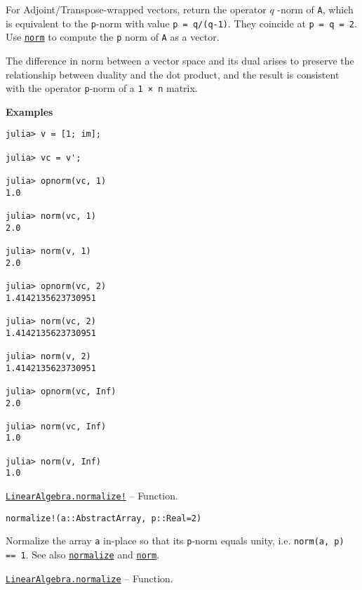 \begin{adjustwidth}{2em}{0pt}
For Adjoint/Transpose-wrapped vectors, return the operator  \(q\) -norm of \texttt{A}, which is equivalent to the \texttt{p}-norm with value \texttt{p = q/(q-1)}. They coincide at \texttt{p = q = 2}. Use \hyperlink{898926013064269707}{\texttt{norm}} to compute the \texttt{p} norm of \texttt{A} as a vector.

The difference in norm between a vector space and its dual arises to preserve the relationship between duality and the dot product, and the result is consistent with the operator \texttt{p}-norm of a \texttt{1 × n} matrix.

\textbf{Examples}


\begin{verbatim}
julia> v = [1; im];

julia> vc = v';

julia> opnorm(vc, 1)
1.0

julia> norm(vc, 1)
2.0

julia> norm(v, 1)
2.0

julia> opnorm(vc, 2)
1.4142135623730951

julia> norm(vc, 2)
1.4142135623730951

julia> norm(v, 2)
1.4142135623730951

julia> opnorm(vc, Inf)
2.0

julia> norm(vc, Inf)
1.0

julia> norm(v, Inf)
1.0
\end{verbatim}



\end{adjustwidth}
\hypertarget{7806117778219468080}{}
\hyperlink{7806117778219468080}{\texttt{LinearAlgebra.normalize!}}  -- {Function.}

\begin{adjustwidth}{2em}{0pt}


\begin{verbatim}
normalize!(a::AbstractArray, p::Real=2)
\end{verbatim}

Normalize the array \texttt{a} in-place so that its \texttt{p}-norm equals unity, i.e. \texttt{norm(a, p) == 1}. See also \hyperlink{10731692832589480792}{\texttt{normalize}} and \hyperlink{898926013064269707}{\texttt{norm}}.



\end{adjustwidth}
\hypertarget{10731692832589480792}{}
\hyperlink{10731692832589480792}{\texttt{LinearAlgebra.normalize}}  -- {Function.}

